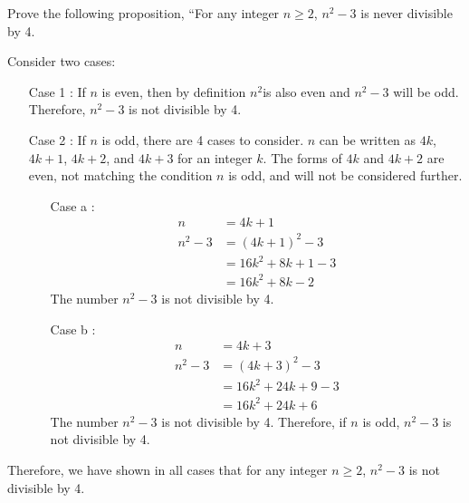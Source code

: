 \documentclass[12pt,addpoints]{exam}
\begin{document}
\begin{questions}
\question Prove the following proposition, ``For any integer $n \geq 2$, $n^2-3$ is never divisible by 4.
    \ifprintanswers
        \vspace{-10pt}
    \fi
\begin{solution}
    Consider two cases:
    \begin{itemize}
        \item[Case 1]: If $n$ is even, then by definition $n^2$is also even and $n^2-3$ will be odd.  Therefore, $n^2-3$ is not divisible by 4.
        \item[Case 2]: If $n$ is odd, there are 4 cases to consider. $n$ can be written as $4k$, $4k+1$, $4k+2$, and $4k+3$ for an integer $k$.  The forms of $4k$ and $4k+2$ are even, not matching the condition $n$ is odd, and will not be considered further.
            \begin{itemize}
                \item[Case a]:
                \begin{align*}
                    n &= 4k + 1 \\
                    n^2 - 3 &= (4k + 1)^2 - 3 \\
                        &= 16k^2 + 8k + 1 - 3 \\
                        &= 16k^2 +8k - 2
                \end{align*}
                The number $n^2-3$ is not divisible by 4.
                \item[Case b]:
                \begin{align*}
                    n &= 4k+3 \\
                    n^2 - 3 &= (4k + 3)^2 - 3 \\
                     &= 16k^2 + 24k + 9 - 3 \\
                     &= 16k^2 + 24k + 6
                \end{align*}
                The number $n^2-3$ is not divisible by 4.
                Therefore, if $n$ is odd, $n^2-3$ is not divisible by 4.
            \end{itemize}
        \end{itemize}
        Therefore, we have shown in all cases that for any integer $n \geq 2$, $n^2 - 3$ is not divisible by 4.
\end{solution}



\end{questions}
\end{document}
